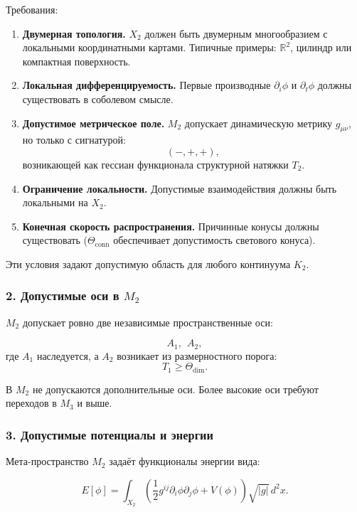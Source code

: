 Требования:

\begin{enumerate}
    \item \textbf{Двумерная топология.}
    $X_2$ должен быть двумерным многообразием с локальными координатными
    картами.
    Типичные примеры: $\mathbb{R}^2$, цилиндр или компактная поверхность.

    \item \textbf{Локальная дифференцируемость.}
    Первые производные $\partial_i\phi$ и $\partial_t\phi$ должны существовать
    в соболевом смысле.

    \item \textbf{Допустимое метрическое поле.}
    $M_2$ допускает динамическую метрику $g_{\mu\nu}$, но только с сигнатурой:
    \[
    (-,+,+),
    \]
    возникающей как гессиан функционала структурной натяжки $T_2$.

    \item \textbf{Ограничение локальности.}
    Допустимые взаимодействия должны быть локальными на $X_2$.

    \item \textbf{Конечная скорость распространения.}
    Причинные конусы должны существовать (\(\Theta_{\text{conn}}\)
    обеспечивает допустимость светового конуса).
\end{enumerate}

Эти условия задают допустимую область для любого континуума $K_2$.

\subsubsection*{2. Допустимые оси в \texorpdfstring{$M_2$}{M_2}}

$M_2$ допускает ровно две независимые пространственные оси:

\[
A_1,\ \ A_2,
\]
где $A_1$ наследуется, а $A_2$ возникает из размерностного порога:
\[
T_1 \ge \Theta_{\text{dim}}.
\]

В $M_2$ не допускаются дополнительные оси.
Более высокие оси требуют переходов в $M_3$ и выше.

\subsubsection*{3. Допустимые потенциалы и энергии}

Мета-пространство $M_2$ задаёт функционалы энергии вида:

\[
E[\phi]
=
\int_{X_2}
\left(
\frac{1}{2} g^{ij} \partial_i \phi \partial_j \phi
+ V(\phi)
\right) \sqrt{|g|}\, d^2x.
\]


